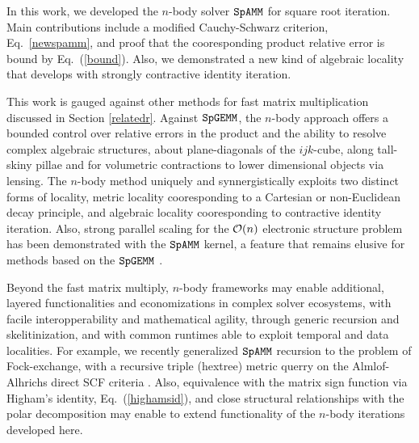\documentclass[letterpaper,twocolumn,amsmath,amsfont,amssymb,english,aps,jcp,preprintnumbers,groupaddress,nofootinbib,tightenlines,floatfix]{revtex4}
\theoremstyle{plain}
\theoremstyle{remark}
\theoremstyle{plain}
\begin{document}
In this work, we developed the $n$-body solver $\tt SpAMM$ for square root iteration.   
Main contributions include a modified Cauchy-Schwarz criterion, Eq.~\ref{newspamm}, and proof that the 
cooresponding product relative error is bound by Eq.~(\ref{bound}).  Also, we demonstrated a new kind of 
algebraic locality that develops with strongly contractive identity iteration.

This work is gauged against other methods for fast matrix multiplication discussed in Section \ref{relatedr}. 
Against $\tt SpGEMM$, the $n$-body approach offers a bounded control over relative errors in 
the product and the ability to resolve complex algebraic structures, about plane-diagonals of the $ijk$-cube, 
along tall-skiny pillae and for volumetric contractions to lower dimensional objects via lensing. 
The $n$-body method uniquely and synnergistically exploits two distinct forms of locality, metric locality cooresponding to 
a Cartesian or non-Euclidean decay principle, and algebraic locality cooresponding to contractive identity iteration. 
Also, strong parallel scaling for the ${\cal{O}}(n)$ electronic structure problem has been demonstrated with the $\tt SpAMM$ kernel, 
a feature that remains elusive for methods based on the $\tt SpGEMM$ \cite{Bowler2014:comment}.


Beyond the fast matrix multiply, $n$-body frameworks may enable additional, layered functionalities and economizations 
in complex solver ecosystems, with facile interopperability and mathematical agility, 
through generic recursion and skelitinization, and with common runtimes able to exploit temporal and data localities.
For example, we recently generalized $\tt SpAMM$ recursion to the problem of Fock-exchange, with a recursive triple (hextree) 
metric querry on the Almlof-Alhrichs direct SCF criteria \cite{challacombe2014n}.  
Also, equivalence with the matrix sign function via Higham's identity, Eq.~(\ref{highamsid}), and close structural relationships with the 
polar decomposition \cite{higham2005} may enable to extend functionality of the $n$-body iterations developed here. 
\end{document}
